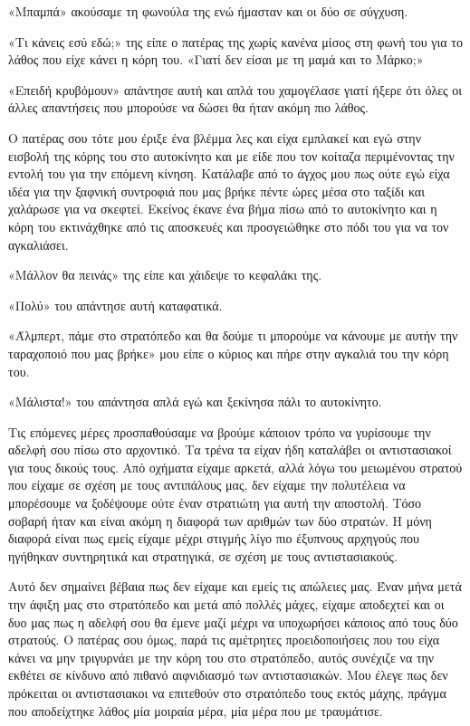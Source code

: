 \documentclass[12pt,twoside, openany]{book}
\begin{document}
«Μπαμπά» ακούσαμε τη φωνούλα της ενώ ήμασταν και οι δύο σε σύγχυση. 

«Τι κάνεις εσύ εδώ;» της είπε ο πατέρας της χωρίς κανένα μίσος στη φωνή του για το λάθος που είχε κάνει η κόρη του. «Γιατί δεν είσαι με τη μαμά και το Μάρκο;»

«Επειδή κρυβόμουν» απάντησε αυτή και απλά του χαμογέλασε γιατί ήξερε ότι όλες οι άλλες απαντήσεις που μπορούσε να δώσει θα ήταν ακόμη πιο λάθος.

Ο πατέρας σου τότε μου έριξε ένα βλέμμα λες και είχα εμπλακεί και εγώ στην εισβολή της κόρης του στο αυτοκίνητο και με είδε που τον κοίταζα περιμένοντας την εντολή του για την επόμενη κίνηση. Κατάλαβε από το άγχος μου πως ούτε εγώ είχα ιδέα για την ξαφνική συντροφιά που μας βρήκε πέντε ώρες μέσα στο ταξίδι και χαλάρωσε για να σκεφτεί. Εκείνος έκανε ένα βήμα πίσω από το αυτοκίνητο και η κόρη του εκτινάχθηκε από τις αποσκευές και προσγειώθηκε στο πόδι του για να τον αγκαλιάσει.

«Μάλλον θα πεινάς» της είπε και χάιδεψε το κεφαλάκι της.

«Πολύ» του απάντησε αυτή καταφατικά.

«Άλμπερτ, πάμε στο στρατόπεδο και θα δούμε τι μπορούμε να κάνουμε με αυτήν την ταραχοποιό που μας βρήκε» μου είπε ο κύριος και πήρε στην αγκαλιά του την κόρη του.

«Μάλιστα!» του απάντησα απλά εγώ και ξεκίνησα πάλι το αυτοκίνητο.

Τις επόμενες μέρες προσπαθούσαμε να βρούμε κάποιον τρόπο να γυρίσουμε την αδελφή σου πίσω στο αρχοντικό. Τα τρένα τα είχαν ήδη καταλάβει οι αντιστασιακοί για τους δικούς τους. Από οχήματα είχαμε αρκετά, αλλά λόγω του μειωμένου στρατού που είχαμε σε σχέση με τους αντιπάλους μας, δεν είχαμε την πολυτέλεια να μπορέσουμε να ξοδέψουμε ούτε έναν στρατιώτη για αυτή την αποστολή. Τόσο σοβαρή ήταν και είναι ακόμη η διαφορά των αριθμών των δύο στρατών. Η μόνη διαφορά είναι πως εμείς είχαμε μέχρι στιγμής λίγο πιο έξυπνους αρχηγούς που ηγήθηκαν συντηρητικά και στρατηγικά, σε σχέση με τους αντιστασιακούς.

Αυτό δεν σημαίνει βέβαια πως δεν είχαμε και εμείς τις απώλειες μας. Έναν μήνα μετά την άφιξη μας στο στρατόπεδο και μετά από πολλές μάχες, είχαμε αποδεχτεί και οι δυο μας πως η αδελφή σου θα έμενε μαζί μέχρι να υποχωρήσει κάποιος από τους δύο στρατούς. Ο πατέρας σου όμως, παρά τις αμέτρητες προειδοποιήσεις που του είχα κάνει να μην τριγυρνάει με την κόρη του στο στρατόπεδο, αυτός συνέχιζε να την εκθέτει σε κίνδυνο από πιθανό αιφνιδιασμό των αντιστασιακών. Μου έλεγε πως δεν πρόκειται οι αντιστασιακοι να επιτεθούν στο στρατόπεδο τους εκτός μάχης, πράγμα που αποδείχτηκε λάθος μία μοιραία μέρα, μία μέρα που με τραυμάτισε.
\end{document}

